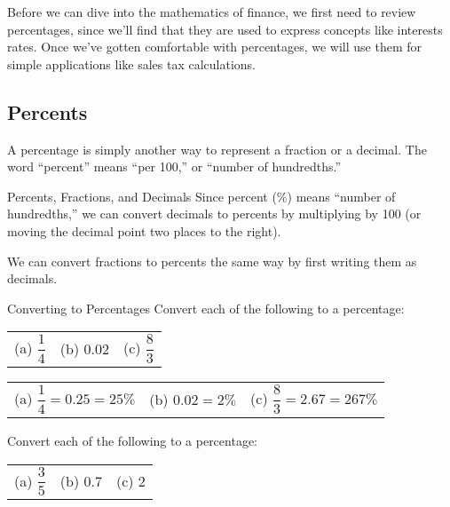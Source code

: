Before we can dive into the mathematics of finance, we first need to review percentages, since we'll find that they are used to express concepts like interests rates.  Once we've gotten comfortable with percentages, we will use them for simple applications like sales tax calculations.

\subsection{Percents}
A percentage is simply another way to represent a fraction or a decimal.  The word ``percent'' means ``per 100,'' or ``number of hundredths.''
\vspace{0.5in}

\begin{proc}{Percents, Fractions, and Decimals}
Since percent (\%) means ``number of hundredths,'' we can convert decimals to percents by multiplying by 100 (or moving the decimal point two places to the right).

We can convert fractions to percents the same way by first writing them as decimals.
\end{proc}
\vspace{0.5in}

\begin{example}[https://www.youtube.com/watch?v=UZHLvEmFrOk]{Converting to Percentages}
Convert each of the following to a percentage:\\

\begin{tabular}{l l l}
(a) $\dfrac{1}{4}$ & (b) $0.02$ & (c) $\dfrac{8}{3}$
\end{tabular}

\begin{center}
\begin{tabular}{l l l}
(a) $\dfrac{1}{4} = 0.25 = 25\%$ & (b) $0.02 = 2\%$ & (c) $\dfrac{8}{3} = 2.67 = 267\%$
\end{tabular}
\end{center}
\end{example}

\begin{try}
Convert each of the following to a percentage:\\

\begin{tabular}{l l l}
(a) $\dfrac{3}{5}$ & (b) $0.7$ & (c) 2
\end{tabular}
\end{try}
\vspace{0.25in}


